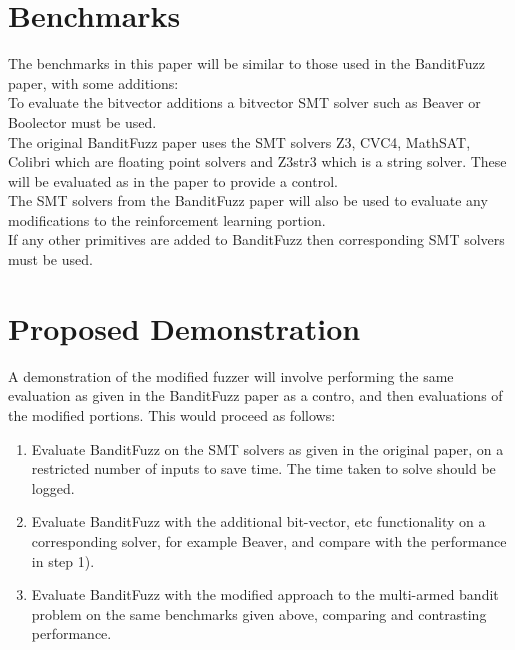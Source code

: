 \documentclass[article,11pt]{article}
\begin{document}
\section*{Benchmarks}
\label{sec:org17be5c7}
The benchmarks in this paper will be similar to those used in the BanditFuzz paper, with some additions:\\
To evaluate the bitvector additions a bitvector SMT solver such as Beaver\cite{beaver} or Boolector\cite{boolector} must be used.\\
The original BanditFuzz paper\cite{bandit} uses the SMT solvers Z3, CVC4, MathSAT, Colibri which are floating point solvers and Z3str3 which is a string solver. These will be evaluated as in the paper to provide a control.\\
The SMT solvers from the BanditFuzz paper will also be used to evaluate any modifications to the reinforcement learning portion.\\
If any other primitives are added to BanditFuzz then corresponding SMT solvers must be used.\\




\section*{Proposed Demonstration}
\label{sec:orgbd10450}
A demonstration of the modified fuzzer will involve performing the same evaluation as given in the BanditFuzz paper\cite{bandit} as a contro, and then evaluations of the modified portions. This would proceed as follows:\\
\begin{enumerate}
\item Evaluate BanditFuzz on the SMT solvers as given in the original paper, on a restricted number of inputs to save time. The time taken to solve should be logged.\\
\item Evaluate BanditFuzz with the additional bit-vector, etc functionality on a corresponding solver, for example Beaver, and compare with the performance in step 1).\\
\item Evaluate BanditFuzz with the modified approach to the multi-armed bandit problem on the same benchmarks given above, comparing and contrasting performance.\\
\end{enumerate}
\end{document}
